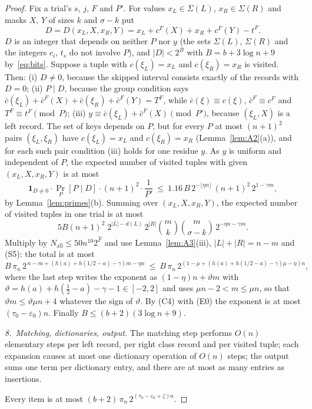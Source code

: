 \documentclass[11pt]{article}
\theoremstyle{definition}
\newcommand{\eps}{\varepsilon}
\newcommand{\bc}{\bar c}
\newcommand{\abs}[1]{\lvert #1\rvert}
\newcommand{\floor}[1]{\lfloor #1\rfloor}
\begin{document}
\begin{proof}
Fix a trial's $s$, $j$, $F$ and $P'$. For values $x_L\in\Sigma(L)$, $x_R\in\Sigma(R)$ and masks $X$, $Y$ of sizes
$k$ and $\sigma-k$ put
\[
 D=D(x_L,X,x_R,Y)=x_L+c^F(X)+x_R+c^F(Y)-t^F .
\]
$D$ is an integer that depends on neither $P$ nor $y$ (the sets $\Sigma(L)$, $\Sigma(R)$ and the integers $c_i$,
$t_s$ do not involve $P$), and $\abs D<2^{B}$ with $B=b+3\log n+9$ by~\eqref{eq:bits}. Suppose a tuple with
$c(\xi_L)=x_L$ and $c(\xi_R)=x_R$ is visited. Then: (i) $D\ne0$, because the skipped interval consists exactly of
the records with $D=0$; (ii) $P\mid D$, because the group condition says
$\bc(\xi_L)+\bc^F(X)+\bc(\xi_R)+\bc^F(Y)=T^F$, while $\bc(\xi)\equiv c(\xi)$, $\bc^F\equiv c^F$ and
$T^F\equiv t^F\pmod P$; (iii) $y\equiv\bc(\xi_L)+\bc^F(X)\pmod{P'}$, because $(\xi_L,X)$ is a left record. The set
of keys depends on $P$, but for every $P$ at most $(n+1)^2$ pairs $(\xi_L,\xi_R)$ have $c(\xi_L)=x_L$ and
$c(\xi_R)=x_R$ (Lemma~\ref{lem:A2}(a)), and for each such pair condition (iii) holds for one residue $y$. As $y$ is
uniform and independent of $P$, the expected number of visited tuples with given $(x_L,X,x_R,Y)$ is at most
\[
 \mathbf 1_{D\ne0}\cdot\Pr_P[P\mid D]\cdot(n+1)^2\cdot\frac1{P'}
 \ \le\ 1.16\,B\,2^{-\floor{\eta n}}\,(n+1)^2\,2^{1-\gamma m},
\]
by Lemma~\ref{lem:primes}(b). Summing over $(x_L,X,x_R,Y)$, the expected number of visited tuples in one trial is
at most
\[
 5B(n+1)^2\;2^{\abs L-d(L)}\,2^{\abs R}\binom mk\binom m{\sigma-k}\,2^{-\eta n-\gamma m}.
\]
Multiply by $N_{\mathrm{all}}\le50n^{10}2^{\hat F}$ and use Lemma~\ref{lem:A3}(iii), $\abs L+\abs R=n-m$ and
\textup{(S5)}: the total is at most
\[
 B\,\pi_n\,2^{\,n-m+(h(a)+h(1/2-a)-\gamma)m-\eta n}\ \le\ B\,\pi_n\,2^{(1-\mu+(h(a)+h(1/2-a)-\gamma)\mu-\eta)n},
\]
where the last step writes the exponent as $(1-\eta)n+\vartheta m$ with
$\vartheta=h(a)+h(\tfrac12-a)-\gamma-1\in[-2,2]$ and uses $\mu n-2<m\le\mu n$, so that $\vartheta m\le\vartheta\mu n+4$
whatever the sign of $\vartheta$. By \textup{(C4)} with \textup{(E0)} the exponent is at most $(\tau_0-\eps_0)n$.
Finally $B\le(b+2)(3\log n+9)$.

\emph{8.\ Matching, dictionaries, output.} The matching step performs $O(n)$ elementary steps per left record, per
right class record and per visited tuple; each expansion causes at most one dictionary operation of $O(n)$ steps;
the output sums one term per dictionary entry, and there are at most as many entries as insertions.

Every item is at most $(b+2)\,\pi_n\,2^{(\tau_0-\eps_0+\zeta)n}$.
\end{proof}
\end{document}
